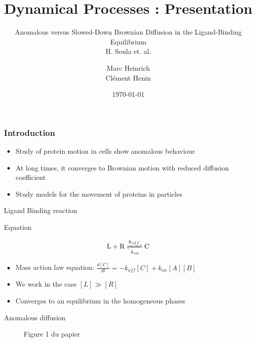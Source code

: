 \documentclass{beamer}
\title{Dynamical Processes : Presentation}
\subtitle{Anomalous versus Slowed-Down Brownian Diffusion
in the Ligand-Binding Equilibrium \\ H. Soula et. al.}
\author{Marc Heinrich \\ Clément Henin}
\date\today
\begin{document}
\begin{frame}
\maketitle
\end{frame}

\begin{frame}
\frametitle{Introduction}
	
\begin{itemize}
\itemsep2em
\item Study of protein motion in cells show anomalous behaviour
\item At long times, it converges to Brownian motion with reduced diffusion coefficient
\item Study models for the movement of proteins in particles
\end{itemize}
\end{frame}

\begin{frame}{Ligand Binding reaction}
\begin{block}{Equation}

\begin{align*}
\mathrm{L+R} \xrightleftharpoons[k_{on}]{k_{off}} \mathrm{C}
\end{align*}
\end{block}

\begin{itemize}
\itemsep1em
\item Mass action law equation: $\frac{d[C]}{dt} = - k_{off}[C] + k_{on}[A][B] $ 
\item We work in the case $[L] \gg [R]$
\item Converges to an equilibrium in the homogeneous phases
\end{itemize}



\end{frame}

\begin{frame}{Anomalous diffusion}

\begin{figure}
\caption{Figure 1 du papier}
\end{figure}

\end{frame}
\end{document}
